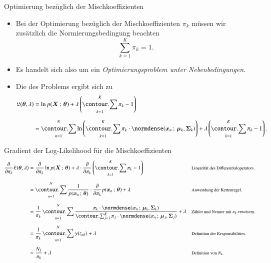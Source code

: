 \begin{frame}{Optimierung bezüglich der Mischkoeffizienten}{}
	\begin{itemize}
		\item Bei der Optimierung bezüglich der Mischkoeffizienten $\pi_k$ müssen wir zusätzlich die Normierungsbedingung beachten
		\begin{equation*}
			\sum_{k=1}^K \pi_k = 1.
		\end{equation*}
		\item Es handelt sich also um ein \textit{Optimierungsproblem unter Nebenbedingungen}.
		\item Die  des Problems ergibt sich zu
		\begin{equation} \label{eq:gmm-mixing-lagrange}
			\begin{aligned}
				\lagrange(\btheta, \lambda)
					&= \ln p(\bX \param \btheta) + \lambda\left( \sum_{k=1}^K \pi_k - 1 \right)
			\\[2mm]
					&= \sum_{n=1}^N \ln\left( \sum_{k=1}^K \pi_k \cdot \normdense(\bx_n \param \bmu_k, \bSigma_k) \right)
						+ \lambda\left( \sum_{k=1}^K \pi_k - 1 \right).
			\end{aligned}
		\end{equation}
	\end{itemize}
\end{frame}


\begin{frame}{Gradient der Log-Likelihood für die Mischkoeffizienten}{}
	\vspace*{-6mm}
	\begin{equation} \label{eq:gmm-grad-mixing}
		\begin{aligned}
			\frac{\partial}{\partial \pi_k} \lagrange(\btheta, \lambda)
				&= \frac{\partial}{\partial \pi_k} \ln p(\bX \param \btheta)
					+ \lambda \cdot \frac{\partial}{\partial \pi_k} \left( \sum_{k=1}^K \pi_k - 1 \right)
				&& \rem{Linearität des Differenzialoperators.}
		\\[2mm]
				&= \sum_{n=1}^N \frac{1}{p(\bx_n \param \btheta)} \cdot \frac{\partial}{\partial \pi_k} p(\bx_n \param \btheta) + \lambda
				&& \rem{Anwendung der Kettenregel.}
		\\[2mm]
				&= \frac{1}{\pi_k} \sum_{n=1}^N \frac{\pi_k \cdot \normdense(\bx_n \param \bmu_k, \bSigma_k)}{
					\sum_{j=1}^K \pi_j \cdot \normdense(\bx_n \param \bmu_j, \bSigma_j)
				} + \lambda
				&& \rem{Zähler und Nenner mit $\pi_k$ erweitern.}
		\\[2mm]
				&= \frac{1}{\pi_k} \sum_{n=1}^N \gamma(z_{nk}) + \lambda
				&& \rem{Definition der Responsibilities.}
		\\[2mm]
				&= \frac{N_k}{\pi_k} + \lambda
				&& \rem{Definition von $N_k$.}
		\end{aligned}
	\end{equation}
\end{frame}


